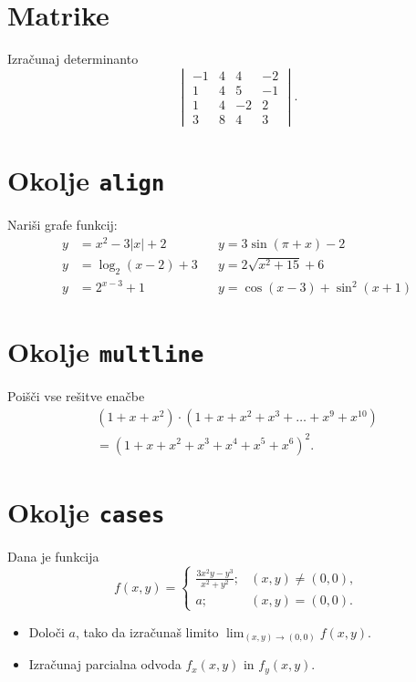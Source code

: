 \documentclass[a4paper,12pt]{article}
\begin{document}
\section*{Matrike}
Izračunaj determinanto
\[
\begin{vmatrix}
   -1 & 4 & 4 & -2 \\
   1 & 4 & 5 & -1 \\
   1 & 4 & -2 & 2 \\
   3 & 8 & 4 & 3 
\end{vmatrix}.
\]
   
\section*{Okolje \texttt{align}}
Nariši grafe funkcij:
\begin{align*}
y &= x^2 - 3|x| + 2  &&  y = 3 \sin(\pi+x) - 2 \\
y &= \log_2(x-2) + 3  && y = 2 \sqrt{x^2+15} + 6 \\
y &= 2^{x-3} + 1    &&   y = \cos(x-3) + \sin^2(x+1)    
\end{align*}


\section*{Okolje \texttt{multline}}
Poišči vse rešitve enačbe
\begin{multline*}
(1+x+x^2) \cdot (1+x+x^2+x^3+\ldots+x^9+x^{10}) \\
=(1+x+x^2+x^3+x^4+x^5+x^6)^2.
\end{multline*}


\section*{Okolje \texttt{cases}}
Dana je funkcija
\[
   f(x,y)=
\begin{cases}
   \frac{3x^2y-y^3}{x^2+y^2}; & (x,y) \not= (0,0),\\
   a; & (x,y) = (0,0).
\end{cases}
\]
\begin{itemize}
\item Določi \(a\), tako da izračunaš limito \( \lim_{(x,y)\to(0,0)} f(x,y) \).
\item Izračunaj parcialna odvoda \(f_x(x,y)\) in \(f_y(x,y)\).
\end{itemize}
\end{document}
